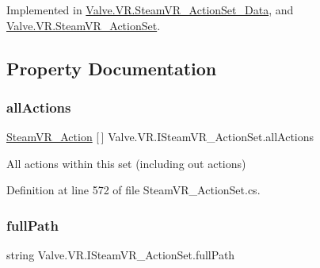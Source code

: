 Implemented in \mbox{\hyperlink{class_valve_1_1_v_r_1_1_steam_v_r___action_set___data_af564cf8c2a12fe9bfab5b801db820f84}{Valve.\+V\+R.\+Steam\+V\+R\+\_\+\+Action\+Set\+\_\+\+Data}}, and \mbox{\hyperlink{class_valve_1_1_v_r_1_1_steam_v_r___action_set_ab43c42368df77386ea8e480817e814cb}{Valve.\+V\+R.\+Steam\+V\+R\+\_\+\+Action\+Set}}.



\subsection{Property Documentation}
\mbox{\label{interface_valve_1_1_v_r_1_1_i_steam_v_r___action_set_a0156b374bb4e45998710402d0f26e7c4}} 
\subsubsection{\texorpdfstring{allActions}{allActions}}
{\footnotesize\ttfamily \mbox{\hyperlink{class_valve_1_1_v_r_1_1_steam_v_r___action}{Steam\+V\+R\+\_\+\+Action}} \mbox{[}$\,$\mbox{]} Valve.\+V\+R.\+I\+Steam\+V\+R\+\_\+\+Action\+Set.\+all\+Actions\hspace{0.3cm}{\ttfamily [get]}}



All actions within this set (including out actions) 



Definition at line 572 of file Steam\+V\+R\+\_\+\+Action\+Set.\+cs.

\mbox{\label{interface_valve_1_1_v_r_1_1_i_steam_v_r___action_set_a5dcb383445b3a9190f5331901cf0112b}} 
\subsubsection{\texorpdfstring{fullPath}{fullPath}}
{\footnotesize\ttfamily string Valve.\+V\+R.\+I\+Steam\+V\+R\+\_\+\+Action\+Set.\+full\+Path\hspace{0.3cm}{\ttfamily [get]}}



